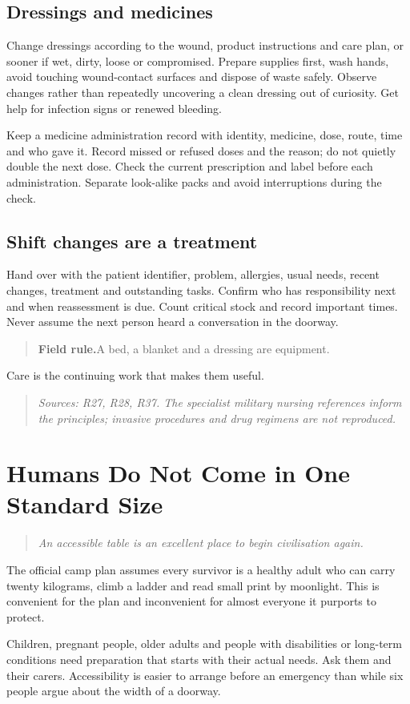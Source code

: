 \documentclass[10pt,openright]{book}
\newcommand{\fieldrule}[1]{\begin{quote}\textbf{Field rule.}\enspace #1\end{quote}}
\begin{document}
\section*{Dressings and medicines}
Change dressings according to the wound, product instructions and care plan, or sooner if wet, dirty, loose or compromised. Prepare supplies first, wash hands, avoid touching wound-contact surfaces and dispose of waste safely. Observe changes rather than repeatedly uncovering a clean dressing out of curiosity. Get help for infection signs or renewed bleeding.

Keep a medicine administration record with identity, medicine, dose, route, time and who gave it. Record missed or refused doses and the reason; do not quietly double the next dose. Check the current prescription and label before each administration. Separate look-alike packs and avoid interruptions during the check.

\section*{Shift changes are a treatment}
Hand over with the patient identifier, problem, allergies, usual needs, recent changes, treatment and outstanding tasks. Confirm who has responsibility next and when reassessment is due. Count critical stock and record important times. Never assume the next person heard a conversation in the doorway.

\fieldrule{A bed, a blanket and a dressing are equipment.}
Care is the continuing work that makes them useful.

\begin{quote}\emph{Sources: R27, R28, R37. The specialist military nursing references inform the principles; invasive procedures and drug regimens are not reproduced.}\end{quote}
\chapter{Humans Do Not Come in One Standard Size}
\begin{quote}\emph{An accessible table is an excellent place to begin civilisation again.}\end{quote}
The official camp plan assumes every survivor is a healthy adult who can carry twenty kilograms, climb a ladder and read small print by moonlight. This is convenient for the plan and inconvenient for almost everyone it purports to protect.

Children, pregnant people, older adults and people with disabilities or long-term conditions need preparation that starts with their actual needs. Ask them and their carers. Accessibility is easier to arrange before an emergency than while six people argue about the width of a doorway.
\end{document}
